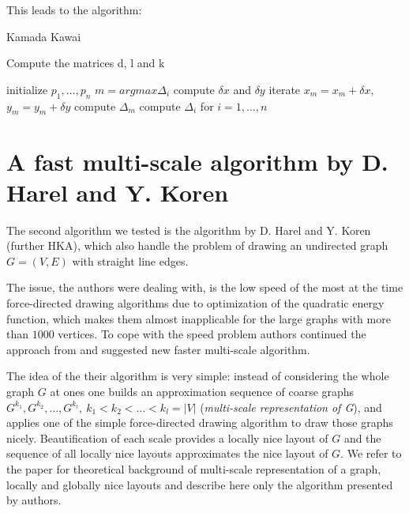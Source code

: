 \documentclass[12pt,a4paper]{article}
\begin{document}
This leads to the algorithm:

\begin{algorithm}
\caption{Kamada Kawai \cite{TomihisaKamada1989}}
\label{KKA}
\begin{algorithmic}[1]
\item Compute the matrices d, l and k
\item initialize $p_1 , \dots, p_n$ 
	\State $ m = argmax \Delta_i $
		\State compute $\delta x$ and $\delta y$
		\State iterate $x_m = x_m + \delta x$, $y_m = y_m + \delta y$
		\State compute $\Delta_m$
	\EndWhile
	\State compute $\Delta_i$ for $i=1, \dots, n$
\EndWhile
\end{algorithmic}

\end{algorithm}

\newpage

\section{A fast multi-scale algorithm by D. Harel and Y. Koren}
\label{section2}

The second algorithm we tested is the algorithm by D. Harel and Y. Koren \cite{DavidHarel2002} (further HKA), which also handle the problem of drawing an undirected graph $G=(V,E)$ with straight line edges.

The issue, the authors were dealing with, is the low speed of the most at the time force-directed drawing algorithms due to optimization of the quadratic energy function, which makes them almost inapplicable for the large graphs with more than $1000$ vertices. To cope with the speed problem authors continued the approach from \cite{HadanyHarel2001} and suggested new faster multi-scale algorithm.

The idea of the their algorithm is very simple: instead of considering the whole graph $G$ at ones one builds an approximation sequence of coarse graphs $G^{k_1}, G^{k_2}, \dots, G^{k_l},\ k_1<k_2<\dots<k_l=|V|$ ({\it multi-scale representation of G}), and applies one of the simple force-directed drawing algorithm to draw those graphs nicely. Beautification of each scale provides a locally nice layout of $G$ and the sequence of all locally nice layouts approximates the nice layout of $G$. We refer to the paper \cite{DavidHarel2002} for theoretical background of multi-scale representation of a graph, locally and globally nice layouts and describe here only the algorithm presented by authors.
\end{document}
